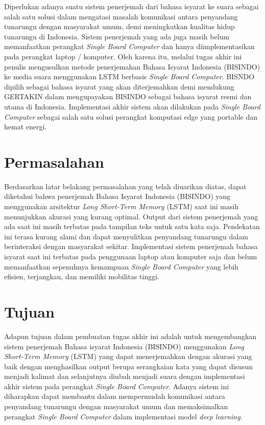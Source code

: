 Diperlukan adanya suatu sistem penerjemah dari bahasa isyarat ke suara sebagai salah satu solusi dalam mengatasi masalah komunikasi antara penyandang tunarungu dengan masyarakat umum, demi meningkatkan kualitas hidup tunarungu di Indonesia. Sistem penerjemah yang ada juga masih belum memanfaatkan perangkat \emph{Single Board Computer} dan hanya diimplementasikan pada perangkat laptop / komputer. Oleh karena itu, melalui tugas akhir ini penulis mengusulkan metode penerjemahan Bahasa Isyarat Indonesia (BISINDO) ke media suara menggunakan LSTM berbasis \emph{Single Board Computer}. BISNDO dipilih sebagai bahasa isyarat yang akan diterjemahkan demi mendukung GERTAKIN dalam mengupayakan BISINDO sebagai bahasa isyarat resmi dan utama di Indonesia. Implementasi akhir sistem akan dilakukan pada \emph{Single Board Computer} sebagai salah satu solusi perangkat komputasi edge yang portable dan hemat energi.

\section{Permasalahan}
\label{sec:permasalahan}

Berdasarkan latar belakang permasalahan yang telah diuarikan diatas, dapat diketahui bahwa penerjemah Bahasa Isyarat Indonesia (BISINDO) yang menggunakan arsitektur \emph{Long Short-Term Memory} (LSTM) saat ini masih menunjukkan akurasi yang kurang optimal. Output dari sistem penerjemah yang ada saat ini masih terbatas pada tampilan teks untuk satu kata saja. Pendekatan ini terasa kurang alami dan dapat menyulitkan penyandang tunarungu dalam berinteraksi dengan masyarakat sekitar. Implementasi sistem penerjemah bahasa isyarat saat ini terbatas pada penggunaan laptop atau komputer saja dan belum memanfaatkan sepenuhnya kemampuan \emph{Single Board Computer} yang lebih efisien, terjangkau, dan memiliki mobilitas tinggi.

\section{Tujuan}
\label{sec:Tujuan}

Adapun tujuan dalam pembuatan tugas akhir ini adalah untuk mengembangkan sistem penerjemah Bahasa isyarat Indonesia (BISINDO) menggunakan \emph{Long Short-Term Memory} (LSTM) yang dapat menerjemahkan dengan akurasi yang baik dengan menghasilkan output berupa serangkaian kata yang dapat disusun menjadi kalimat dan selanjutnya diubah menjadi suara dengan implementasi akhir sistem pada perangkat \emph{Single Board Computer}. Adanya sistem ini diharapkan dapat membantu dalam mempermudah komunikasi antara penyandang tunarungu dengan masyarakat umum dan memaksimalkan perangkat \emph{Single Board Computer} dalam implementasi model \emph{deep learning}.  

